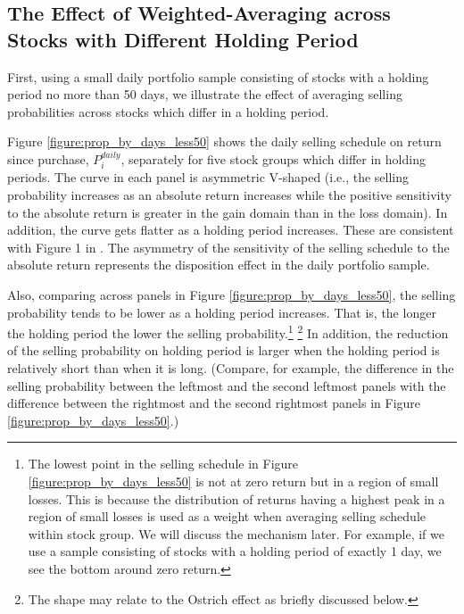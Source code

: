 \documentclass[11pt, a4paper]{article}
\begin{document}
\subsection{The Effect of Weighted-Averaging across Stocks with Different Holding Period}
\label{section:ave}
First, using a small daily portfolio sample consisting of stocks with a holding period no more than 50 days, we illustrate the effect of averaging selling probabilities across stocks which differ in a holding period.

Figure \ref{figure:prop_by_days_less50} shows the daily selling schedule on return since purchase, $P^{daily}_{i}$, separately for five stock groups which differ in holding periods. The curve in each panel is asymmetric V-shaped (i.e., the selling probability increases as an absolute return increases while the positive sensitivity to the absolute return is greater in the gain domain than in the loss domain). In addition, the curve gets flatter as a holding period increases. These are consistent with Figure 1 in \citet{BenDavidHirshleifer12}. The asymmetry of the sensitivity of the selling schedule to the absolute return represents the disposition effect in the daily portfolio sample.

Also, comparing across panels in Figure \ref{figure:prop_by_days_less50}, the selling probability tends to be lower as a holding period increases. That is, the longer the holding period the lower the selling probability.\footnote{The lowest point in the selling schedule in Figure \ref{figure:prop_by_days_less50} is not at zero return but in a region of small losses. This is because the distribution of returns having a highest peak in a region of small losses is used as a weight when averaging selling schedule within stock group. We will discuss the mechanism later. For example, if we use a sample consisting of stocks with a holding period of exactly 1 day, we see the bottom around zero return.} \footnote{The shape may relate to the Ostrich effect as briefly discussed below.} In addition, the reduction of the selling probability on holding period is larger when the holding period is relatively short than when it is long. (Compare, for example, the difference in the selling probability between the leftmost and the second leftmost panels with the difference between the rightmost and the second rightmost panels in Figure \ref{figure:prop_by_days_less50}.)
\end{document}
